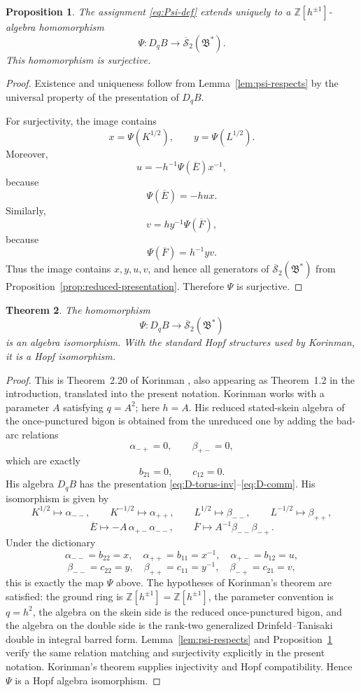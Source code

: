 \documentclass[12pt]{article}
\theoremstyle{plain}
\newtheorem{theorem}{Theorem}[section]
\newtheorem{proposition}[theorem]{Proposition}
\theoremstyle{definition}
\numberwithin{equation}{section}
\newcommand{\Ring}{\mathbb{Z}[h^{\pm 1}]}
\newcommand{\bigon}{\mathfrak{B}^{*}}
\newcommand{\hS}{\overline{\mathscr{S}}}
\newcommand{\DqB}{D_qB}
\newcommand{\Khalf}{K^{1/2}}
\newcommand{\Kmh}{K^{-1/2}}
\newcommand{\Lhalf}{L^{1/2}}
\newcommand{\Lmh}{L^{-1/2}}
\newcommand{\Ebar}{\overline{E}}
\newcommand{\Fbar}{\overline{F}}
\begin{document}
\begin{proposition}\label{prop:psi-hom}
The assignment \eqref{eq:Psi-def} extends uniquely to a \(\Ring\)-algebra homomorphism
\[
\Psi:\DqB\longrightarrow \hS_2(\bigon).
\]
This homomorphism is surjective.
\end{proposition}

\begin{proof}
Existence and uniqueness follow from Lemma~\ref{lem:psi-respects} by the universal property of the presentation of \(\DqB\).

For surjectivity, the image contains
\[
x=\Psi(\Khalf),
\qquad
y=\Psi(\Lhalf).
\]
Moreover,
\[
u=-h^{-1}\Psi(\Ebar)x^{-1},
\]
because
\[
\Psi(\Ebar)=-h u x.
\]
Similarly,
\[
v=h y^{-1}\Psi(\Fbar),
\]
because
\[
\Psi(\Fbar)=h^{-1}y v.
\]
Thus the image contains \(x,y,u,v\), and hence all generators of \(\hS_2(\bigon)\) from Proposition~\ref{prop:reduced-presentation}.  Therefore \(\Psi\) is surjective.
\end{proof}

\begin{theorem}\label{thm:rank-two-double-skein}
The homomorphism
\[
\Psi:\DqB\longrightarrow \hS_2(\bigon)
\]
is an algebra isomorphism.  With the standard Hopf structures used by Korinman, it is a Hopf isomorphism.
\end{theorem}

\begin{proof}
This is Theorem~2.20 of Korinman \cite{Korinman}, also appearing as Theorem~1.2 in the introduction, translated into the present notation.  Korinman works with a parameter \(A\) satisfying \(q=A^2\); here \(h=A\).  His reduced stated-skein algebra of the once-punctured bigon is obtained from the unreduced one by adding the bad-arc relations
\[
\alpha_{-+}=0,
\qquad
\beta_{+-}=0,
\]
which are exactly
\[
b_{21}=0,
\qquad
c_{12}=0.
\]
His algebra \(\DqB\) has the presentation \eqref{eq:D-torus-inv}--\eqref{eq:D-comm}.  His isomorphism is given by
\[
\Khalf\mapsto \alpha_{--},
\qquad
\Kmh\mapsto \alpha_{++},
\qquad
\Lhalf\mapsto \beta_{--},
\qquad
\Lmh\mapsto \beta_{++},
\]
\[
\Ebar\mapsto -A\,\alpha_{+-}\alpha_{--},
\qquad
\Fbar\mapsto A^{-1}\beta_{--}\beta_{-+}.
\]
Under the dictionary
\[
\alpha_{--}=b_{22}=x,
\quad
\alpha_{++}=b_{11}=x^{-1},
\quad
\alpha_{+-}=b_{12}=u,
\]
\[
\beta_{--}=c_{22}=y,
\quad
\beta_{++}=c_{11}=y^{-1},
\quad
\beta_{-+}=c_{21}=v,
\]
this is exactly the map \(\Psi\) above.
The hypotheses of Korinman's theorem are satisfied: the ground ring is \(\Ring=\mathbb Z[h^{\pm1}]\), the parameter convention is \(q=h^2\), the algebra on the skein side is the reduced once-punctured bigon, and the algebra on the double side is the rank-two generalized Drinfeld--Tanisaki double in integral barred form.  Lemma~\ref{lem:psi-respects} and Proposition~\ref{prop:psi-hom} verify the same relation matching and surjectivity explicitly in the present notation.  Korinman's theorem supplies injectivity and Hopf compatibility.  Hence \(\Psi\) is a Hopf algebra isomorphism.
\end{proof}
\end{document}
